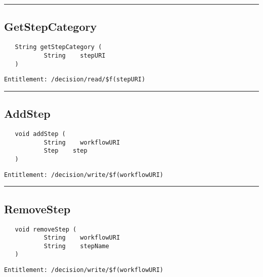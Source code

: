 \rule{12cm}{2pt}
\subsection{GetStepCategory}
\label{Api:GetStepCategory}
\begin{verbatim}
   String getStepCategory (
           String    stepURI
   )
\end{verbatim}
\begin{Verbatim}[fontsize=\small, formatcom=\color{Maroon}]
  Entitlement: /decision/read/$f(stepURI)
\end{Verbatim}



\rule{12cm}{2pt}
\subsection{AddStep}
\label{Api:AddStep}
\begin{verbatim}
   void addStep (
           String    workflowURI
           Step    step
   )
\end{verbatim}
\begin{Verbatim}[fontsize=\small, formatcom=\color{Maroon}]
  Entitlement: /decision/write/$f(workflowURI)
\end{Verbatim}



\rule{12cm}{2pt}
\subsection{RemoveStep}
\label{Api:RemoveStep}
\begin{verbatim}
   void removeStep (
           String    workflowURI
           String    stepName
   )
\end{verbatim}
\begin{Verbatim}[fontsize=\small, formatcom=\color{Maroon}]
  Entitlement: /decision/write/$f(workflowURI)
\end{Verbatim}



